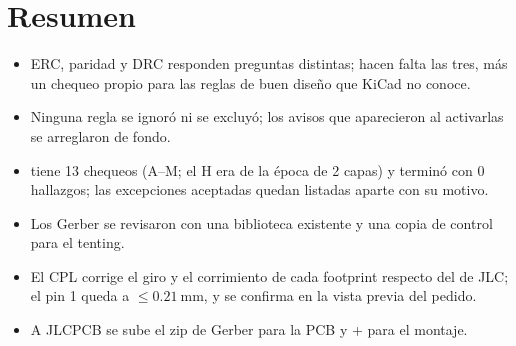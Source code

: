 \section*{Resumen}
\begin{itemize}
  \item ERC, paridad y DRC responden preguntas distintas; hacen falta las tres, más un chequeo propio para las reglas
  de buen diseño que KiCad no conoce.
  \item Ninguna regla se ignoró ni se excluyó; los avisos que aparecieron al activarlas se arreglaron de fondo.
  \item {} tiene 13 chequeos (A--M; el H era de la época de 2 capas) y terminó con 0 hallazgos; las excepciones aceptadas
  quedan listadas aparte con su motivo.
  \item Los Gerber se revisaron con una biblioteca existente y una copia de control para el tenting.
  \item El CPL corrige el giro y el corrimiento de cada footprint respecto del de JLC; el pin 1 queda a
  $\le\SI{0.21}{\milli\meter}$, y se confirma en la vista previa del pedido.
  \item A JLCPCB se sube el zip de Gerber para la PCB y  +  para el montaje.
\end{itemize}
